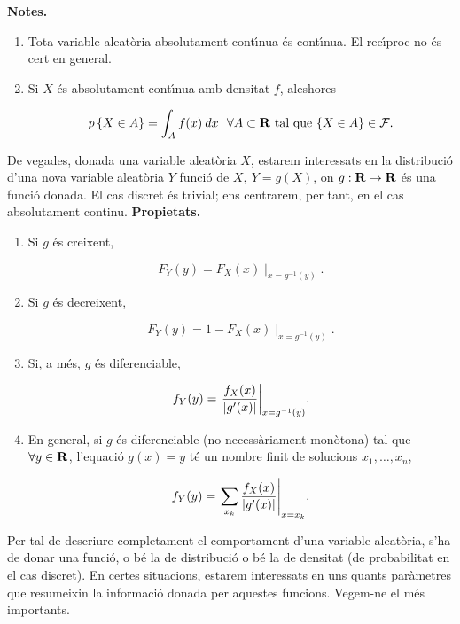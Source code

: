 {\bf Notes.}

\begin{enumerate}

\item Tota variable aleat\`oria absolutament cont\'{\i}nua \'es cont\'{\i}nua. El
rec\'{\i}proc no \'es cert en general.

\item Si $X$ \'es absolutament cont\'{\i}nua amb densitat $f$, aleshores

$$\pp{X \in A} = \int_A f(x) \> dx \ \ \forall A \subset \RR \mbox{ tal que } \{ X
\in A \} \in {\cal F}.$$
\end{enumerate}

De vegades, donada una variable aleat\`oria $X$, estarem interessats en la
distribuci\'o d'una nova variable aleat\`oria $Y$ funci\'o de $X, \ Y = g(X)$, on
$g
: {\bf R} \to {\bf R}$ \'es una funci\'o donada. El cas discret \'es trivial; ens
centrarem, per
tant, en el cas absolutament continu.
\newpage
{\bf Propietats.}

\begin{enumerate}
\item Si $g$ \'es creixent,

$$F_Y(y) = F_X(x) \mid_{x = g^{-1}(y)}.$$

\item Si $g$ \'es decreixent,

$$F_Y(y) = 1 - F_X(x) \mid_{x = g^{-1}(y)}.$$

\item Si, a m\'es, $g$ \'es diferenciable,

$$f_Y(y) = {\left.{f_X(x) \over |g'(x)|}\right|}_{x = g^{-1}(y)}.$$

\item En general, si $g$ \'es diferenciable (no necess\`ariament mon\`otona) tal
que\break
$\forall y \in {\bf R}$, l'equaci\'o $g(x) = y$ t\'e un nombre finit de solucions
$x_1,
\ldots, x_n$,

$$f_Y(y) = {\left.\sum_{x_k} {f_X(x) \over |g'(x)|}\right|}_{x = x_k}.$$

\end{enumerate}

Per tal de descriure completament el comportament d'una variable aleat\`oria,
s'ha de donar una funci\'o, o b\'e la de distribuci\'o o b\'e la de densitat (de
probabilitat en el cas discret). En certes situacions, estarem interessats en
uns quants par\`ametres que resumeixin la informaci\'o donada per aquestes
funcions. Vegem-ne el m\'es importants.

